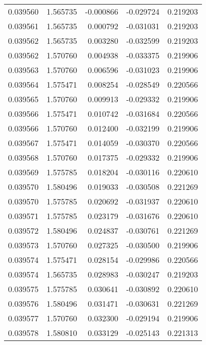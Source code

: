 \begin{tabular}{lrrrr}
0.039560    &  1.565735 & -0.000866 & -0.029724 &             0.219203 \\
0.039561    &  1.565735 &  0.000792 & -0.031031 &             0.219203 \\
0.039562    &  1.565735 &  0.003280 & -0.032599 &             0.219203 \\
0.039562    &  1.570760 &  0.004938 & -0.033375 &             0.219906 \\
0.039563    &  1.570760 &  0.006596 & -0.031023 &             0.219906 \\
0.039564    &  1.575471 &  0.008254 & -0.028549 &             0.220566 \\
0.039565    &  1.570760 &  0.009913 & -0.029332 &             0.219906 \\
0.039566    &  1.575471 &  0.010742 & -0.031684 &             0.220566 \\
0.039566    &  1.570760 &  0.012400 & -0.032199 &             0.219906 \\
0.039567    &  1.575471 &  0.014059 & -0.030370 &             0.220566 \\
0.039568    &  1.570760 &  0.017375 & -0.029332 &             0.219906 \\
0.039569    &  1.575785 &  0.018204 & -0.030116 &             0.220610 \\
0.039570    &  1.580496 &  0.019033 & -0.030508 &             0.221269 \\
0.039570    &  1.575785 &  0.020692 & -0.031937 &             0.220610 \\
0.039571    &  1.575785 &  0.023179 & -0.031676 &             0.220610 \\
0.039572    &  1.580496 &  0.024837 & -0.030761 &             0.221269 \\
0.039573    &  1.570760 &  0.027325 & -0.030500 &             0.219906 \\
0.039574    &  1.575471 &  0.028154 & -0.029986 &             0.220566 \\
0.039574    &  1.565735 &  0.028983 & -0.030247 &             0.219203 \\
0.039575    &  1.575785 &  0.030641 & -0.030892 &             0.220610 \\
0.039576    &  1.580496 &  0.031471 & -0.030631 &             0.221269 \\
0.039577    &  1.570760 &  0.032300 & -0.029194 &             0.219906 \\
0.039578    &  1.580810 &  0.033129 & -0.025143 &             0.221313 \\

\end{tabular}
